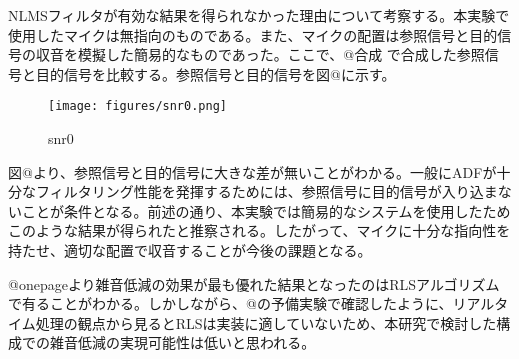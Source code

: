 NLMSフィルタが有効な結果を得られなかった理由について考察する。本実験で使用したマイクは無指向のものである。また、マイクの配置は参照信号と目的信号の収音を模擬した簡易的なものであった。ここで、@合成
で合成した参照信号と目的信号を比較する。参照信号と目的信号を図@に示す。

\begin{figure}
\centering
\texttt{[image: figures/snr0.png]}
\caption{snr0}
\end{figure}

図@より、参照信号と目的信号に大きな差が無いことがわかる。一般にADFが十分なフィルタリング性能を発揮するためには、参照信号に目的信号が入り込まないことが条件となる。前述の通り、本実験では簡易的なシステムを使用したためこのような結果が得られたと推察される。したがって、マイクに十分な指向性を持たせ、適切な配置で収音することが今後の課題となる。

@onepageより雑音低減の効果が最も優れた結果となったのはRLSアルゴリズムで有ることがわかる。しかしながら、@の予備実験で確認したように、リアルタイム処理の観点から見るとRLSは実装に適していないため、本研究で検討した構成での雑音低減の実現可能性は低いと思われる。
